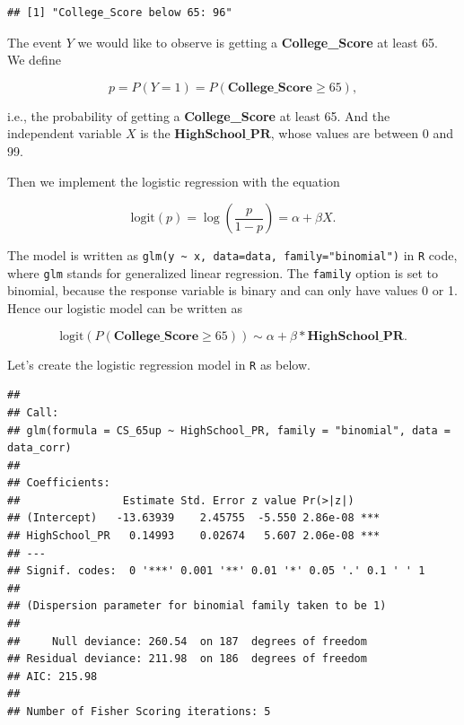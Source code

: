 \documentclass[
]{article}
\newenvironment{Shaded}{\begin{snugshade}}{\end{snugshade}}
\newcommand{\AttributeTok}[1]{\textcolor[rgb]{0.77,0.63,0.00}{#1}}
\newcommand{\CommentTok}[1]{\textcolor[rgb]{0.56,0.35,0.01}{\textit{#1}}}
\newcommand{\DecValTok}[1]{\textcolor[rgb]{0.00,0.00,0.81}{#1}}
\newcommand{\FunctionTok}[1]{\textcolor[rgb]{0.00,0.00,0.00}{#1}}
\newcommand{\NormalTok}[1]{#1}
\newcommand{\OtherTok}[1]{\textcolor[rgb]{0.56,0.35,0.01}{#1}}
\newcommand{\SpecialCharTok}[1]{\textcolor[rgb]{0.00,0.00,0.00}{#1}}
\newcommand{\StringTok}[1]{\textcolor[rgb]{0.31,0.60,0.02}{#1}}
\begin{document}
\begin{verbatim}
## [1] "College_Score below 65: 96"
\end{verbatim}

The event \(Y\) we would like to observe is getting a
\textbf{College\_Score} at least 65. We define

\[p = P(Y=1) = P(\textbf{College}\_\textbf{Score} \geq 65),\]

i.e., the probability of getting a \textbf{College\_Score} at least 65.
And the independent variable \(X\) is the
\(\textbf{HighSchool}\_\textbf{PR}\), whose values are between 0 and 99.

Then we implement the logistic regression with the equation

\[\text{logit}(p) = \log (\dfrac{p}{1-p}) = \alpha + \beta X.\]

The model is written as
\texttt{glm(y\ \textasciitilde{}\ x,\ data=data,\ family="binomial")} in
\texttt{R} code, where \texttt{glm} stands for generalized linear
regression. The \texttt{family} option is set to binomial, because the
response variable is binary and can only have values 0 or 1. Hence our
logistic model can be written as

\[\text{logit}(P(\textbf{College}\_\textbf{Score} \geq 65)) \sim \alpha + \beta * \textbf{HighSchool}\_\textbf{PR}.\]

Let's create the logistic regression model in \texttt{R} as below.

\begin{Shaded}
\end{Shaded}

\begin{verbatim}
## 
## Call:
## glm(formula = CS_65up ~ HighSchool_PR, family = "binomial", data = data_corr)
## 
## Coefficients:
##                Estimate Std. Error z value Pr(>|z|)    
## (Intercept)   -13.63939    2.45755  -5.550 2.86e-08 ***
## HighSchool_PR   0.14993    0.02674   5.607 2.06e-08 ***
## ---
## Signif. codes:  0 '***' 0.001 '**' 0.01 '*' 0.05 '.' 0.1 ' ' 1
## 
## (Dispersion parameter for binomial family taken to be 1)
## 
##     Null deviance: 260.54  on 187  degrees of freedom
## Residual deviance: 211.98  on 186  degrees of freedom
## AIC: 215.98
## 
## Number of Fisher Scoring iterations: 5
\end{verbatim}
\end{document}
